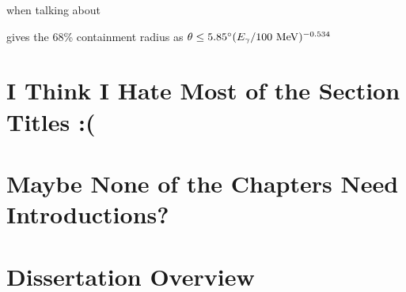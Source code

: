 when talking about \egret{}

\cite{Thomson93} gives the 68\% containment radius as $\theta \leq 5.85^\circ (E_\gamma /100 ~\mathrm{MeV} )^{-0.534}$
\section{I Think I Hate Most of the Section Titles :(}

\section{Maybe None of the Chapters Need Introductions?}

\section{Dissertation Overview}



